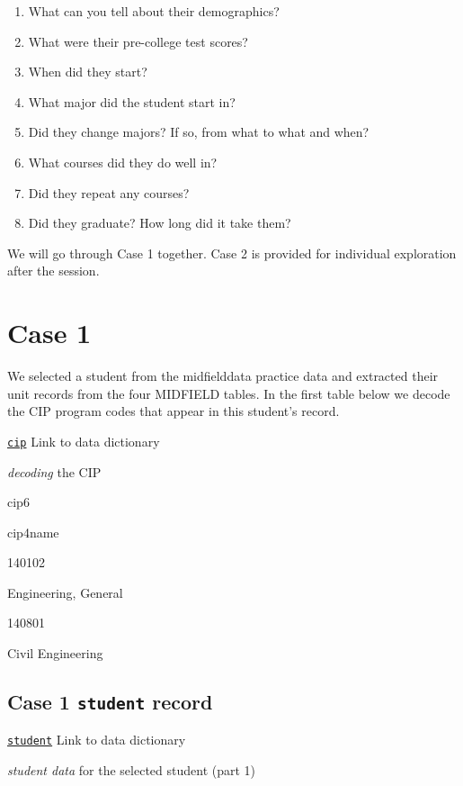 \documentclass[
]{book}
\providecommand{\tightlist}{%
  \setlength{\itemsep}{0pt}\setlength{\parskip}{0pt}}
\begin{document}
\begin{enumerate}
\def\labelenumi{\arabic{enumi}.}
\tightlist
\item
  What can you tell about their demographics?
\item
  What were their pre-college test scores?
\item
  When did they start?
\item
  What major did the student start in?
\item
  Did they change majors? If so, from what to what and when?
\item
  What courses did they do well in?
\item
  Did they repeat any courses?
\item
  Did they graduate? How long did it take them?
\end{enumerate}

We will go through Case 1 together. Case 2 is provided for individual exploration after the session.

\hypertarget{case-1}{%
\section{Case 1}\label{case-1}}

We selected a student from the midfielddata practice data and extracted their unit records from the four MIDFIELD tables. In the first table below we decode the CIP program codes that appear in this student's record.

\href{https://midfieldr.github.io/midfieldr/reference/cip.html}{\texttt{cip}} Link to data dictionary

\emph{decoding} the CIP

cip6

cip4name

140102

Engineering, General

140801

Civil Engineering

\hypertarget{case-1-student-record}{%
\subsection{\texorpdfstring{Case 1 \texttt{student} record}{Case 1 student record}}\label{case-1-student-record}}

\href{https://midfieldr.github.io/midfielddata/reference/student.html}{\texttt{student}} Link to data dictionary

\emph{student data} for the selected student (part 1)
\end{document}
